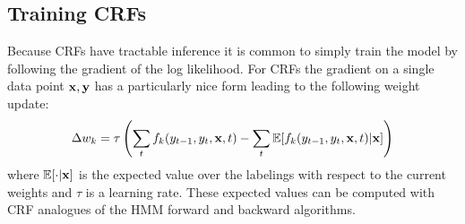 \subsection{Training CRFs}

Because CRFs have tractable inference it is common to simply train the model by following the gradient of the log likelihood. For CRFs the gradient on a single data point $\mathbf{x}, \mathbf{y}$ has a particularly nice form leading to the following weight update:
\begin{align*}
\Delta w_k = \tau \left(\sum_{t} f_k(y_{t-1}, y_{t}, \mathbf{x}, t) - \sum_{t} \mathbb{E} [f_k(y_{t-1}, y_{t}, \mathbf{x}, t) | \mathbf{x}]\right)
\end{align*}
where $\mathbb{E} [ \cdot | \mathbf{x}]$ is the expected value over the labelings with respect to the current weights and $\tau$ is a learning rate. These expected values can be computed with CRF analogues of the HMM forward and backward algorithms. 

